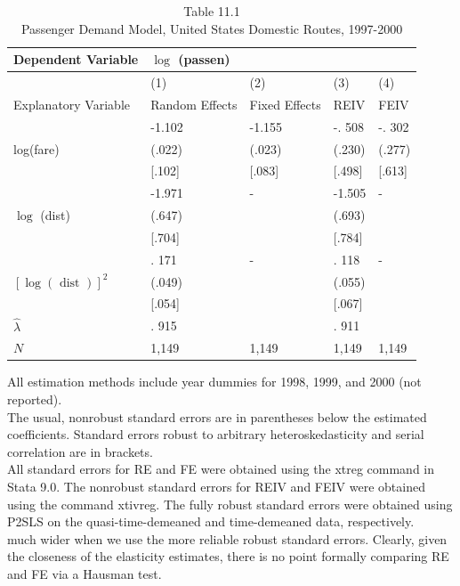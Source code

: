 \documentclass[10pt]{article}
\begin{document}
\begin{table}[h]
\begin{center}
\captionsetup{labelformat=empty}
\caption{Table 11.1\\
Passenger Demand Model, United States Domestic Routes, 1997-2000}
\begin{tabular}{|l|l|l|l|l|}
\hline
Dependent Variable & \multicolumn{4}{|l|}{$\log$ (passen)} \\
\hline
 & (1) & (2) & (3) & (4) \\
\hline
Explanatory Variable & Random Effects & Fixed Effects & REIV & FEIV \\
\hline
\multirow[t]{3}{*}{log(fare)} & -1.102 & -1.155 & -. 508 & -. 302 \\
\hline
 & (.022) & (.023) & (.230) & (.277) \\
\hline
 & [.102] & [.083] & [.498] & [.613] \\
\hline
\multirow[t]{3}{*}{$\log$ (dist)} & -1.971 & - & -1.505 & - \\
\hline
 & (.647) &  & (.693) &  \\
\hline
 & [.704] &  & [.784] &  \\
\hline
\multirow[t]{3}{*}{$[\log (\text { dist })]^{2}$} & . 171 & - & . 118 & - \\
\hline
 & (.049) &  & (.055) &  \\
\hline
 & [.054] &  & [.067] &  \\
\hline
$\hat{\lambda}$ & . 915 &  & . 911 &  \\
\hline
$N$ & 1,149 & 1,149 & 1,149 & 1,149 \\
\hline
\end{tabular}
\end{center}
\end{table}

All estimation methods include year dummies for 1998, 1999, and 2000 (not reported).\\
The usual, nonrobust standard errors are in parentheses below the estimated coefficients. Standard errors robust to arbitrary heteroskedasticity and serial correlation are in brackets.\\
All standard errors for RE and FE were obtained using the xtreg command in Stata 9.0. The nonrobust standard errors for REIV and FEIV were obtained using the command xtivreg. The fully robust standard errors were obtained using P2SLS on the quasi-time-demeaned and time-demeaned data, respectively.\\
much wider when we use the more reliable robust standard errors. Clearly, given the closeness of the elasticity estimates, there is no point formally comparing RE and FE via a Hausman test.
\end{document}
